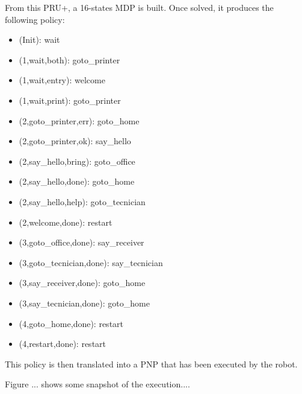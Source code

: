 %

From this PRU+, a 16-states MDP is built. %
Once solved, it produces the following policy:
\begin{multicols}{2}
  \begin{small}
    \begin{itemize}
    \item (Init): wait
    \item (1,wait,both): goto\_printer
    \item (1,wait,entry): welcome
    \item (1,wait,print): goto\_printer
    \item (2,goto\_printer,err): goto\_home
    \item (2,goto\_printer,ok): say\_hello
    \item (2,say\_hello,bring): goto\_office
    \item (2,say\_hello,done): goto\_home
    \item (2,say\_hello,help): goto\_tecnician
    \item (2,welcome,done): restart
    \item (3,goto\_office,done): say\_receiver
    \item (3,goto\_tecnician,done): say\_tecnician
    \item (3,say\_receiver,done): goto\_home
    \item (3,say\_tecnician,done): goto\_home
    \item (4,goto\_home,done): restart
    \item (4,restart,done): restart
    \end{itemize}
  \end{small}
\end{multicols}

This policy is then translated into a PNP that has been executed by the robot.

Figure ... shows some snapshot of the execution....


